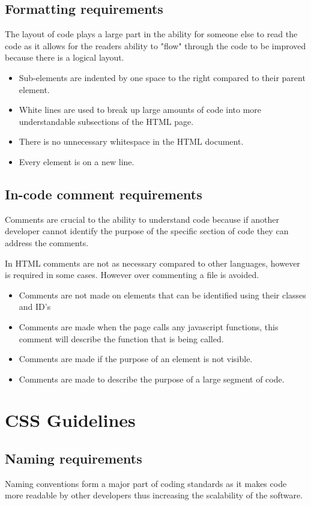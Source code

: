 \documentclass[11pt]{article}
\begin{document}
	\subsection{Formatting requirements}
	The layout of code plays a large part in the ability for someone else to read the code as it allows for the readers ability to "flow" through the code to be improved because there is a logical layout.
	\begin{itemize}
		\item Sub-elements are indented by one space to the right compared to their parent element.
		\item White lines are used to break up large amounts of code into more understandable subsections of the HTML page.
		\item There is no unnecessary whitespace in the HTML document.
		\item Every element is on a new line.
	\end{itemize}
	\subsection{In-code comment requirements}
	Comments are crucial to the ability to understand code because if another developer cannot identify the purpose of the specific section of code they can address the comments.
	
	In HTML comments are not as necessary compared to other languages, however is required in some cases. However over commenting a file is avoided.
	\begin{itemize}
		\item Comments are not made on elements that can be identified using their classes and ID's
		\item Comments are made when the page calls any javascript functions, this comment will describe the function that is being called.
		\item Comments are made if the purpose of an element is not visible.
		\item Comments are made to describe the purpose of a large segment of code.
	\end{itemize}
	\section{CSS Guidelines}
	\subsection{Naming requirements}
	Naming conventions form a major part of coding standards as it makes code more readable by other developers thus increasing the scalability of the software.
\end{document}
